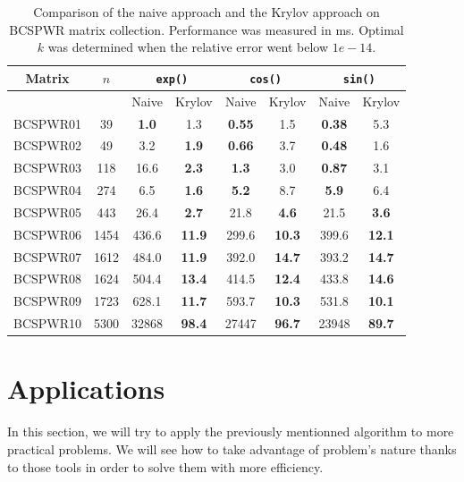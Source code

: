\documentclass[11pt]{article}
\numberwithin{equation}{section}
\begin{document}
\begin{table}
    \centering
    \caption{Comparison of the naive approach and the Krylov approach on BCSPWR matrix collection. Performance was measured in ms. Optimal $k$ was determined when the relative error went below $1e-14$.}
    \begin{tabular}{|c|c||c|c|c|c|c|c|}
        \hline
        Matrix & $n$ & \multicolumn{2}{|c|}{\texttt{exp()}} & \multicolumn{2}{|c|}{\texttt{cos()}} & \multicolumn{2}{|c|}{\texttt{sin()}} \\\hline
        & & Naive & Krylov & Naive & Krylov & Naive & Krylov \\\hline
        BCSPWR01 & 39 & \textbf{1.0} & 1.3 & \textbf{0.55} & 1.5 & \textbf{0.38} & 5.3\\\hline
        BCSPWR02 & 49 & 3.2 & \textbf{1.9} & \textbf{0.66} & 3.7 & \textbf{0.48} & 1.6\\\hline
        BCSPWR03 & 118 & 16.6 & \textbf{2.3} & \textbf{1.3} & 3.0 & \textbf{0.87} & 3.1\\\hline
        BCSPWR04 & 274 & 6.5 & \textbf{1.6} & \textbf{5.2} & 8.7 & \textbf{5.9} & 6.4\\\hline
        BCSPWR05 & 443 & 26.4 & \textbf{2.7} & 21.8 & \textbf{4.6} & 21.5 & \textbf{3.6}\\\hline
        BCSPWR06 & 1454 & 436.6 & \textbf{11.9} & 299.6 & \textbf{10.3} & 399.6 & \textbf{12.1}\\\hline
        BCSPWR07 & 1612 & 484.0 & \textbf{11.9} & 392.0 & \textbf{14.7} & 393.2 & \textbf{14.7}\\\hline
        BCSPWR08 & 1624 & 504.4 & \textbf{13.4} & 414.5 & \textbf{12.4} & 433.8 & \textbf{14.6}\\\hline
        BCSPWR09 & 1723 & 628.1 & \textbf{11.7} & 593.7 & \textbf{10.3} & 531.8 & \textbf{10.1}\\\hline
        BCSPWR10 & 5300 & 32868 & \textbf{98.4} & 27447 & \textbf{96.7} & 23948 & \textbf{89.7}\\\hline
    \end{tabular}
    \label{tab:fab2}
\end{table}

\section{Applications}
In this section, we will try to apply the previously mentionned algorithm to more practical problems. We will see how to take advantage of problem's nature thanks to those tools in order to solve them with more efficiency.
\end{document}
